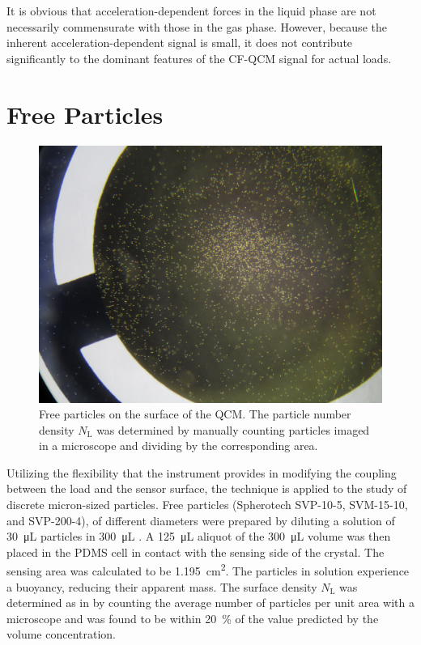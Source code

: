 It is obvious that acceleration-dependent forces in the liquid phase are not
necessarily commensurate with those in the gas phase.  However, because the
inherent acceleration-dependent signal is small, it does not contribute
significantly to the dominant features of the CF-QCM signal for actual loads.

\section{Free Particles}
\begin{figure}
\centering
\includegraphics[keepaspectratio,width=12cm]{qcm/figures/qcm_beadssurface.jpg}
\caption{Free particles on the surface of the QCM\@.  The particle number
				density $N_\mathrm{L}$ was determined by manually counting
				particles imaged in a microscope and dividing by the corresponding area.}
\label{fig:countparticles}
\end{figure}
Utilizing the flexibility that the instrument provides in modifying the
coupling between the load and the sensor surface, the technique is applied
to the study of discrete micron-sized particles.
Free particles (Spherotech SVP-10-5, SVM-15-10, and SVP-200-4), of
different diameters were prepared by diluting a solution of
\SI{30}{\micro\liter} particles in \SI{300}{\micro\liter} .  A
\SI{125}{\micro\liter} aliquot of the \SI{300}{\micro\liter} volume was
then placed in the PDMS cell in contact with the sensing side of the
crystal.  The sensing area was calculated to be
\SI{1.195}{\centi\meter\squared}.  The particles in solution experience a
buoyancy, reducing their apparent mass. The surface density
$N_\mathrm{L}$ was determined as in  by counting the average number of particles
per unit area with a microscope and was found to be within
\SI{20}{\percent} of the value predicted by the volume concentration.

